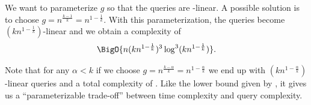 We want to parameterize \(g\) so that the queries are -linear. A
possible solution is to choose \(g = n^{\frac{k-1}{k}} = n^{1-\frac{1}{k}}\).
With this parameterization, the queries become \((kn^{1-\frac{1}{k}})\)-linear
and we obtain a complexity of
\begin{displaymath}
\BigO{n (kn^{1-\frac{1}{k}})^3 \log^3 (kn^{1-\frac{1}{k}}) }.
\end{displaymath}

Note that for any \(\alpha < k\) if we choose \(g = n^{\frac{k-\alpha}{k}} =
n^{1-\frac{\alpha}{k}}\) we end up with \((kn^{1-\frac{\alpha}{k}})\)-linear
queries and a total complexity of
.
Like the lower bound given by \citet*{ailon:2005}, it gives us a
``parameterizable trade-off''
between time complexity and query complexity.
